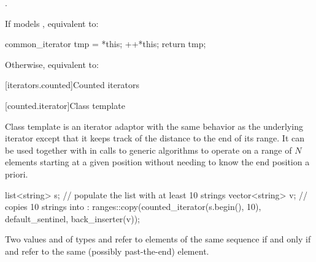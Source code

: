 \documentclass{wg21}
\begin{document}
\begin{itemdescr}
	\pnum
	\begin{addedm}
		\mandates
	\end{addedm}

	\expects {}.
	
	\pnum
	\effects
	If  models , equivalent to:
	\begin{codeblock}
		common_iterator tmp = *this;
		++*this;
		return tmp;
	\end{codeblock}
	Otherwise, equivalent to: 
\end{itemdescr}


[iterators.counted]{Counted iterators}

[counted.iterator]{Class template }

\pnum
Class template  is an iterator adaptor
with the same behavior as the underlying iterator except that
it keeps track of the distance to the end of its range.
It can be used together with 
in calls to generic algorithms to operate on
a range of $N$ elements starting at a given position
without needing to know the end position a priori.

\pnum
\begin{example}
	\begin{codeblock}
		list<string> s;
		// populate the list  with at least 10 strings
		vector<string> v;
		// copies 10 strings into :
		ranges::copy(counted_iterator(s.begin(), 10), default_sentinel, back_inserter(v));
	\end{codeblock}
\end{example}

\pnum
Two values  and  of types
and
refer to elements of the same sequence if and only if
and
refer to the same (possibly past-the-end) element.
\end{document}
